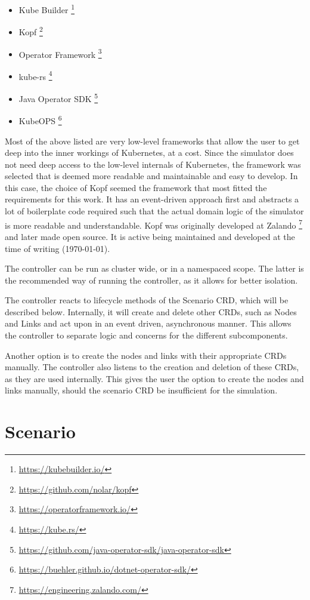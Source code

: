 \begin{itemize}
  \item Kube Builder \footnote{\url{https://kubebuilder.io/}}
  \item Kopf \footnote{\url{https://github.com/nolar/kopf}}
  \item Operator Framework \footnote{\url{https://operatorframework.io/}}
  \item kube-rs \footnote{\url{https://kube.rs/}}
  \item Java Operator SDK \footnote{\url{https://github.com/java-operator-sdk/java-operator-sdk}}
  \item KubeOPS \footnote{\url{https://buehler.github.io/dotnet-operator-sdk/}}
\end{itemize}

Most of the above listed are very low-level frameworks that allow the user to get deep into the inner workings of Kubernetes, at a cost. Since the simulator does not need deep access to the low-level internals of Kubernetes, the framework was selected that is deemed more readable and maintainable and easy to develop. In this case, the choice of Kopf seemed the framework that most fitted the requirements for this work. It has an event-driven approach first and abstracts a lot of boilerplate code required such that the actual domain logic of the simulator is more readable and understandable. Kopf was originally developed at Zalando \footnote{\url{https://engineering.zalando.com/}} and later made open source. It is active being maintained and developed at the time of writing (\today).

The controller can be run as cluster wide, or in a namespaced scope. The latter is the recommended way of running the controller, as it allows for better isolation.

The controller reacts to lifecycle methods of the Scenario CRD, which will be described below. Internally, it will create and delete other CRDs, such as Nodes and Links and act upon in an event driven, asynchronous manner. This allows the controller to separate logic and concerns for the different subcomponents.

Another option is to create the nodes and links with their appropriate CRDs manually. The controller also listens to the creation and deletion of these CRDs, as they are used internally. This gives the user the option to create the nodes and links manually, should the scenario CRD be insufficient for the simulation.

\section{Scenario}

